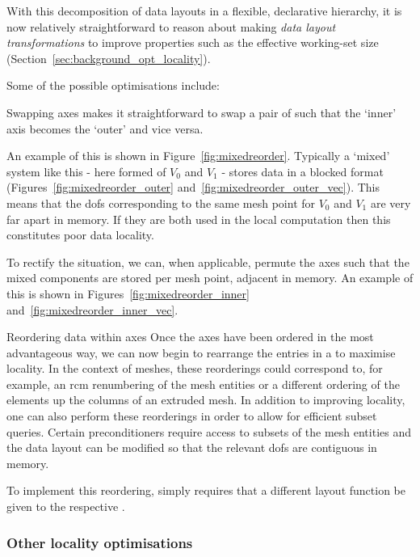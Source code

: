 With this decomposition of data layouts in a flexible, declarative hierarchy, it is now relatively straightforward to reason about making \textit{data layout transformations} to improve properties such as the effective working-set size (Section~\ref{sec:background_opt_locality}).

Some of the possible optimisations include:

\begin{paragraph}{Swapping axes}
 makes it straightforward to swap a pair of  such that the `inner' axis becomes the `outer' and vice versa.

An example of this is shown in Figure~\ref{fig:mixedreorder}.
Typically a `mixed' system like this - here formed of $V_0$ and $V_1$ - stores data in a blocked format (Figures~\ref{fig:mixedreorder_outer} and~\ref{fig:mixedreorder_outer_vec}).
This means that the \glspl{dof} corresponding to the same mesh point for $V_0$ and $V_1$ are very far apart in memory.
If they are both used in the local computation then this constitutes poor data locality.

To rectify the situation, we can, when applicable, permute the axes such that the mixed components are stored per mesh point, adjacent in memory.
An example of this is shown in Figures~\ref{fig:mixedreorder_inner} and~\ref{fig:mixedreorder_inner_vec}.
\end{paragraph}

\begin{paragraph}{Reordering data within axes}
Once the axes have been ordered in the most advantageous way, we can now begin to rearrange the entries in a  to maximise locality.
In the context of meshes, these reorderings could correspond to, for example, an \gls{rcm} renumbering of the mesh entities or a different ordering of the elements up the columns of an extruded mesh.
In addition to improving locality, one can also perform these reorderings in order to allow for efficient subset queries.
Certain preconditioners require access to subsets of the mesh entities and the data layout can be modified so that the relevant \glspl{dof} are contiguous in memory.

To implement this reordering,  simply requires that a different layout function be given to the respective .
\end{paragraph}

\subsubsection{Other locality optimisations}

